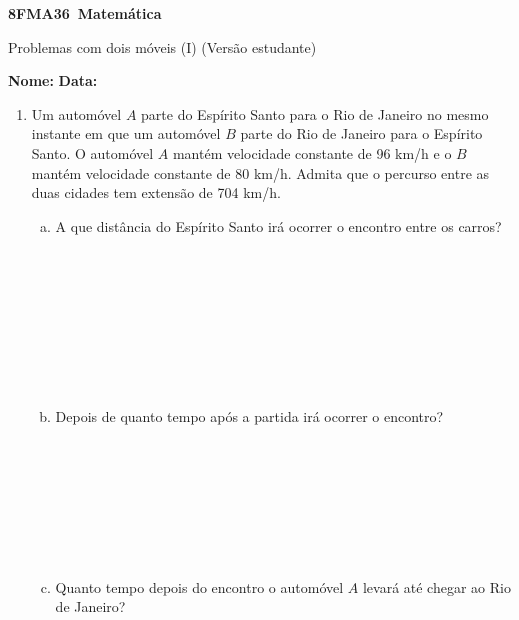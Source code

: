 \documentclass[a4paper,14pt]{article}
\begin{document}
	
	\noindent\textbf{8FMA36~Matemática} 
	
	\begin{center}Problemas com dois móveis (I) (Versão estudante)
	\end{center}
	
	\noindent\textbf{Nome:} \underline{\hspace{10cm}}
	\noindent\textbf{Data:} \underline{\hspace{4cm}}
	
	
    \begin{multicols}{2}
    	\begin{enumerate}
    		\item Um automóvel $A$ parte do Espírito Santo para o Rio de Janeiro no mesmo instante em que um automóvel $B$ parte do Rio de Janeiro para o Espírito Santo. O automóvel $A$ mantém velocidade constante de 96 km/h e o $B$ mantém velocidade constante de 80 km/h. Admita que o percurso entre as duas cidades tem extensão de 704 km/h.
    		\begin{enumerate}[a)]
    			\item A que distância do Espírito Santo irá ocorrer o encontro entre os carros? \\\\\\\\\\\\\\\\\\
    			\item Depois de quanto tempo após a partida irá ocorrer o encontro? \\\\\\\\\\\\\\\\
    			\item Quanto tempo depois do encontro o automóvel $A$ levará até chegar ao Rio de Janeiro? \\\\\\\\\\\\\\\\\\\\\\\\\\

\end{enumerate}
\end{enumerate}
\end{multicols}
\end{document}

